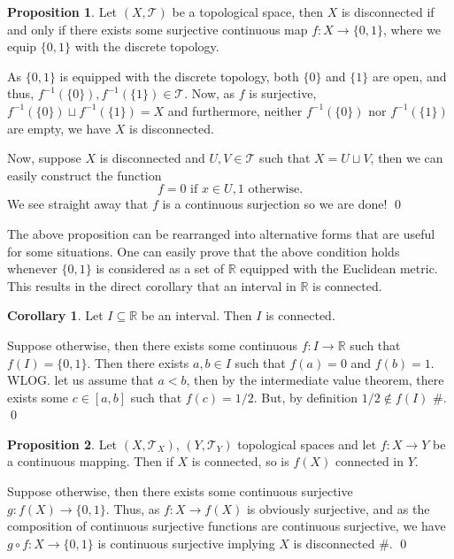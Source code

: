 \documentclass[
]{article}
\theoremstyle{definition}
\newtheorem{prop}{Proposition}
\newtheorem{corollary}{Corollary}[section]
\theoremstyle{definition}
\begin{document}
\begin{prop}
  Let \((X, \mathcal{T})\) be a topological space, then \(X\) is disconnected 
  if and only if there exists some surjective continuous map \(f : X \to \{0, 1\}\),
  where we equip \(\{0, 1\}\) with the discrete topology. 
\end{prop}
\proof

As \(\{0, 1\}\) is equipped with the discrete topology, both \(\{0\}\)
and \(\{1\}\) are open, and thus,
\(f^{-1}(\{0\}), f^{-1}(\{1\}) \in \mathcal{T}\). Now, as \(f\) is
surjective, \(f^{-1}(\{0\}) \sqcup f^{-1}(\{1\}) = X\) and furthermore,
neither \(f^{-1}(\{0\})\) nor \(f^{-1}(\{1\})\) are empty, we have \(X\)
is disconnected.

Now, suppose \(X\) is disconnected and \(U, V \in \mathcal{T}\) such
that \(X = U \sqcup V\), then we can easily construct the function
\[f = 0 \text{ if } x \in U, 1 \text{ otherwise.}\] We see straight away
that \(f\) is a continuous surjection so we are done! \qed

The above proposition can be rearranged into alternative forms that are
useful for some situations. One can easily prove that the above
condition holds whenever \(\{0, 1\}\) is considered as a set of
\(\mathbb{R}\) equipped with the Euclidean metric. This results in the
direct corollary that an interval in \(\mathbb{R}\) is connected.

\begin{corollary}
  Let \(I \subseteq \mathbb{R}\) be an interval. Then \(I\) is connected.
\end{corollary}
\proof

Suppose otherwise, then there exists some continuous
\(f : I \to \mathbb{R}\) such that \(f(I) = \{0, 1\}\). Then there
exists \(a, b \in I\) such that \(f(a) = 0\) and \(f(b) = 1\). WLOG. let
us assume that \(a < b\), then by the intermediate value theorem, there
exists some \(c \in [a, b]\) such that \(f(c) = 1 / 2\). But, by
definition \(1 / 2 \not\in f(I)\) \#. \qed

\begin{prop}
  Let \((X, \mathcal{T}_X)\), \((Y, \mathcal{T}_Y)\) topological spaces and let 
  \(f : X \to Y\) be a continuous mapping. Then if \(X\) is connected, so is 
  \(f(X)\) connected in \(Y\).
\end{prop}
\proof

Suppose otherwise, then there exists some continuous surjective
\(g : f(X) \to \{0, 1\}\). Thus, as \(f : X \to f(X)\) is obviously
surjective, and as the composition of continuous surjective functions
are continuous surjective, we have \(g \circ f : X \to \{0, 1\}\) is
continuous surjective implying \(X\) is disconnected \#. \qed
\end{document}
